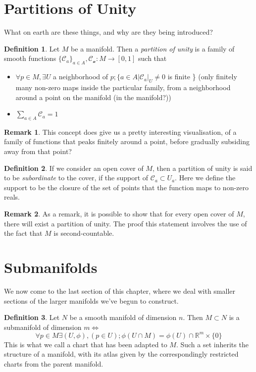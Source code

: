 \documentclass[12pt]{book}
\theoremstyle{definition}
\newtheorem*{definition}{Definition}
\newtheorem*{remark}{Remark}
\begin{document}
\section{Partitions of Unity}
What on earth are these things, and why are they being introduced?
\begin{definition}
    Let $M$ be a manifold. Then a \textit{partition of unity} is a family of smooth functions $\{\mathcal{C}_a\}_{a \in A}, \mathcal{C_a}: M \to [0, 1]$ such that \begin{itemize}
        \item $\forall p \in M, \exists U$ a neighborhood of $p; \{a \in A| \mathcal{C}_a |_U \neq 0$ is finite \} (only finitely many non-zero maps inside the particular family, from a neighborhood around a point on the manifold (in the manifold?))
        \item $\sum_{a \in A} \mathcal{C}_a = 1$
    \end{itemize}
\end{definition}
\begin{remark}
    This concept does give us a pretty interesting visualisation, of a family of functions that peaks finitely around a point, before gradually subsiding away from that point?
\end{remark}
\begin{definition}
    If we consider an open cover of $M$, then a partition of unity is said to be \textit{subordinate} to the cover, if the support of $\mathcal{C}_a \subset U_a$. Here we define the support to be the closure of the set of points that the function maps to non-zero reals.
\end{definition}
\begin{remark}
    As a remark, it is possible to show that for every open cover of $M$, there will exist a partition of unity. The proof this statement involves the use of the fact that $M$ is second-countable.
\end{remark}
\section{Submanifolds}
We now come to the last section of this chapter, where we deal with smaller sections of the larger manifolds we've begun to construct.
\begin{definition}
    Let $N$ be a smooth manifold of dimension $n$. Then $M \subset N$ is a submanifold of dimension $m \iff$ 
    $$\forall p \in M \exists (U, \phi), (p \in U); \phi (U \cap M) = \phi(U) \cap \mathbb{R}^m\times\{0\}$$ This is what we call a chart that has been adapted to $M$. Such a set inherits the structure of a manifold, with its atlas given by the correspondingly restricted charts from the parent manifold.
\end{definition}
\end{document}
